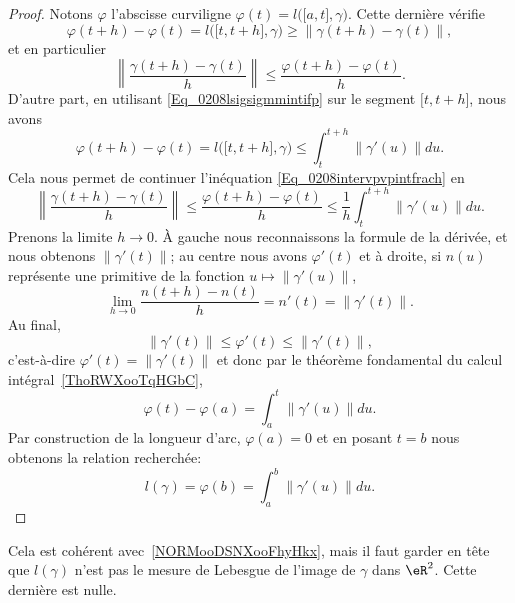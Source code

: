 \begin{proof}
	Notons $\varphi$ l'abscisse curviligne $\varphi(t)=l\big( \mathopen[ a , t \mathclose],\gamma \big)$. Cette dernière vérifie
	\begin{equation}
		\varphi(t+h)-\varphi(t)=l\big( \mathopen[ t , t+h \mathclose],\gamma \big)\geq \| \gamma(t+h)-\gamma(t) \|,
	\end{equation}
	et en particulier
	\begin{equation}     \label{Eq_0208intervpvpintfrach}
		\left\| \frac{ \gamma(t+h)-\gamma(t) }{ h } \right\|\leq \frac{ \varphi(t+h)-\varphi(t) }{ h }.
	\end{equation}
	D'autre part, en utilisant \eqref{Eq_0208lsigsigmmintifp} sur le segment $\mathopen[ t , t+h \mathclose]$, nous avons
	\begin{equation}
		\varphi(t+h)-\varphi(t)=l\big( \mathopen[ t , t+h \mathclose],\gamma \big)\leq\int_{t}^{t+h}\| \gamma'(u) \|du.
	\end{equation}
	Cela nous permet de continuer l'inéquation \eqref{Eq_0208intervpvpintfrach} en
	\begin{equation}
		\left\| \frac{ \gamma(t+h)-\gamma(t) }{ h } \right\|\leq\frac{ \varphi(t+h)-\varphi(t) }{ h }\leq\frac{1}{ h }\int_t^{t+h}\| \gamma'(u) \|du.
	\end{equation}
	Prenons la limite $h\to 0$. À gauche nous reconnaissons la formule de la dérivée, et nous obtenons $\| \gamma'(t) \|$; au centre nous avons $\varphi'(t)$ et à droite, si $n(u)$ représente une primitive de la fonction $u\mapsto\| \gamma'(u) \|$,
	\begin{equation}
		\lim_{h\to 0}\frac{ n(t+h)-n(t) }{ h }=n'(t)=\| \gamma'(t) \|.
	\end{equation}
	Au final,
	\begin{equation}
		\| \gamma'(t) \|\leq \varphi'(t)\leq\| \gamma'(t) \|,
	\end{equation}
	c'est-à-dire $\varphi'(t)=\| \gamma'(t) \|$ et donc par le théorème fondamental du calcul intégral~\ref{ThoRWXooTqHGbC},
	\begin{equation}
		\varphi(t)-\varphi(a)=\int_a^t\| \gamma'(u) \|du.
	\end{equation}
	Par construction de la longueur d'arc, $\varphi(a)=0$ et en posant $t=b$ nous obtenons la relation recherchée:
	\begin{equation}
		l(\gamma)=\varphi(b)=\int_a^b\| \gamma'(u) \|du.
	\end{equation}
\end{proof}

\begin{remark}  \label{RemLongIntUn}
	Cela est cohérent avec~\ref{NORMooDSNXooFhyHkx}, mais il faut garder en tête que \( l(\gamma)\) n'est pas le mesure de Lebesgue de l'image de \( \gamma\) dans \( \eR^2\). Cette dernière est nulle.
\end{remark}


